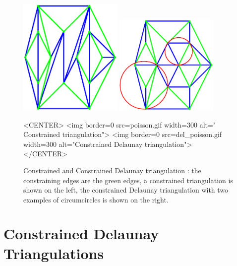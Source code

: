 
\begin{figure}
\begin{ccTexOnly}
\begin{center}
\includegraphics[width=5cm]{poisson.ps}
\includegraphics[width=5cm]{del_poisson.ps}
\end{center}
\end{ccTexOnly}
\caption{Constrained and Constrained Delaunay triangulation : 
 the constraining edges are the green edges,  a constrained
triangulation is shown on the left, the constrained Delaunay
triangulation with two examples of circumcircles is shown on the right.}
\label{I1_Fig_constrained}
\begin{ccHtmlOnly}
<CENTER>
<img border=0 src=poisson.gif width=300 alt=" Constrained triangulation">
<img border=0 src=del_poisson.gif width=300 alt="Constrained Delaunay triangulation">
</CENTER>
\end{ccHtmlOnly}
\end{figure}


\section{Constrained Delaunay Triangulations}
\label{Section_2D_Triangulations_Constrained_Delaunay}

